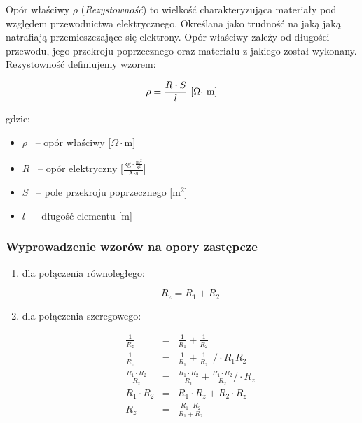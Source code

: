 \documentclass[a4paper,12pts]{article}
\begin{document}
	Opór właściwy $\rho$ (\textit{Rezystowność}) to wielkość charakteryzująca materiały pod względem przewodnictwa elektrycznego. Określana jako trudność na jaką jaką natrafiają przemieszczające się elektrony. Opór właściwy zależy od długości przewodu, jego przekroju poprzecznego oraz materiału z jakiego został wykonany. Rezystowność definiujemy wzorem:
	
	\begin{equation}
		\rho = \frac{R \cdot S}{l} \textrm{  [$\Omega \cdot$ \textrm{m}]}
	\end{equation}

	gdzie: 
	\begin{itemize}
		\item $\rho$ ~-- opór właściwy [$\Omega \cdot \textrm{m}$]
		\item $R$ ~-- opór elektryczny [$\frac{\textrm{kg} \cdot \frac{\textrm{m}^{2}}{\textrm{s}^{2}}}{\textrm{A} \cdot \textrm{s}}$]
		\item $S$ ~-- pole przekroju poprzecznego [\textrm{m}$^{2}$]
		\item $l$ ~-- długość elementu [m]
	\end{itemize}


	\subsubsection{Wyprowadzenie wzorów na opory zastępcze}
	
	\begin{enumerate}
		\item dla połączenia równoległego:
		
		\begin{equation}
			R_{z} = R_{1} + R_{2} 
		\end{equation}
		
		\item dla połączenia szeregowego:
	
		\begin{flushright}
		\begin{eqnarray}
			\frac{1}{R_{z}} & = & \frac{1}{R_{1}} + \frac{1}{R_{2}} \nonumber \\
			 \frac{1}{R_{z}} & = & \frac{1}{R_{1}} + \frac{1}{R_{2}} ~~/ \cdot R_{1}{R_{2}}  \nonumber \\
			 \frac{R_{1} \cdot R_{2}}{R_{z}} & = & \frac{R_{1} \cdot R_{2}}{R_{1}} + \frac{R_{1} \cdot R_{2}}{R_{2}} / \cdot R_{z} \nonumber \\
			 R_{1} \cdot R_{2} & = & R_{1} \cdot R_{z} + R_{2} \cdot R_{z} \nonumber \\
			 R_{z} & = & \frac{R_{1} \cdot R_{2}}{R_{1} + R_{2}} \nonumber \\		 		 						
		\end{eqnarray}
		\end{flushright}
\end{enumerate}
\end{document}
